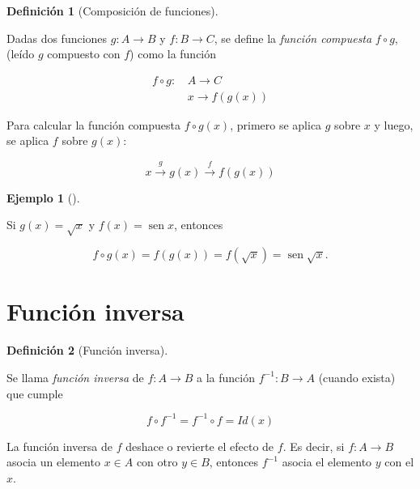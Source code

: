 \documentclass[
  a4paper,
]{scrreport}
\theoremstyle{definition}
\newtheorem{example}{Ejemplo}[chapter]
\theoremstyle{plain}
\theoremstyle{definition}
\newtheorem{definition}{Definición}[chapter]
\theoremstyle{definition}
\theoremstyle{plain}
\theoremstyle{plain}
\theoremstyle{remark}
\begin{document}
\begin{definition}[Composición de
funciones]\protect\hypertarget{def-composicion-funciones}{}\label{def-composicion-funciones}

Dadas dos funciones \(g:A\rightarrow B\) y \(f:B\rightarrow C\), se
define la \emph{función compuesta} \(f\circ g\), (leído \(g\) compuesto
con \(f\)) como la función

\[\begin{aligned}
f\circ g:\,& A\longrightarrow C\\
& x\longrightarrow f(g(x))\end{aligned}\]

\end{definition}

Para calcular la función compuesta \(f\circ g(x)\), primero se aplica
\(g\) sobre \(x\) y luego, se aplica \(f\) sobre \(g(x)\):

\[x\stackrel{g}{\longrightarrow}g(x)\stackrel{f}{\longrightarrow}f(g(x))\]

\begin{example}[]\protect\hypertarget{exm-composicion-funciones}{}\label{exm-composicion-funciones}

Si \(g(x)=\sqrt x\) y \(f(x)=\operatorname{sen} x\), entonces

\[f\circ g(x)=f(g(x))=f(\sqrt x)=\operatorname{sen} \sqrt x.\]

\end{example}

\section{Función inversa}\label{funciuxf3n-inversa-1}

\begin{definition}[Función
inversa]\protect\hypertarget{def-funcion-inversa}{}\label{def-funcion-inversa}

Se llama \emph{función inversa} de \(f:A\rightarrow B\) a la función
\(f^{-1}:B\rightarrow A\) (cuando exista) que cumple

\[f\circ f^{-1}=f^{-1}\circ f=Id(x)\]

\end{definition}

La función inversa de \(f\) deshace o revierte el efecto de \(f\). Es
decir, si \(f:A\rightarrow B\) asocia un elemento \(x\in A\) con otro
\(y\in B\), entonces \(f^{-1}\) asocia el elemento \(y\) con el \(x\).
\end{document}
